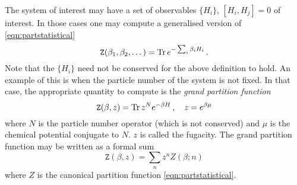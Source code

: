 \documentclass[main.tex]{subfiles}
\begin{document}
The system of interest may have a set of observables $\{H_i\}$, $[H_i,H_j]=0$ of interest.  In those cases one may compute a generalised version of \eqref{eqn:partstatistical}
\begin{equation}\label{eqn:partstatistical2}
\mathtt{Z}(\beta_1,\beta_2,\dots)=\operatorname{Tr} e^{-\sum_i\beta_iH_i}\,.
\end{equation}
Note that the $\{H_i\}$ need not be conserved for the above definition to hold.
An example of this is when the particle number of the system is not fixed.  In that case, the appropriate quantity to compute is the \textit{grand partition function}
\begin{equation}\label{eqn:partstatistical3}
\mathtt{Z}(\beta,z)=\operatorname{Tr} z^{N}e^{-\beta H}\,,\quad z=e^{\beta \mu}
\end{equation}
where $N$ is the particle number operator (which is not conserved) and $\mu$ is the chemical potential conjugate to $N$.  $z$ is called the fugacity.  The grand partition function may be written as a formal sum
\begin{equation}
\mathtt{Z}(\beta,z)=\sum_{n} z^{n}Z(\beta;n)
\end{equation}
where $Z$ is the canonical partition function \eqref{eqn:partstatistical}.
\end{document}
